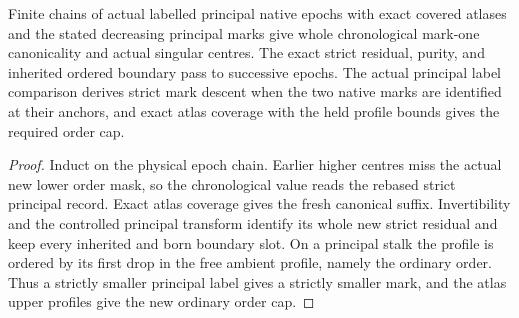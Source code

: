 \begin{theorem}
\label{hir:g8-principal-labelled-epoch-succession}
\leanok
Finite chains of actual labelled principal native epochs with
exact covered atlases and the stated decreasing principal marks
give whole chronological mark-one canonicality and actual
singular centres. The exact strict residual, purity, and inherited
ordered boundary pass to successive epochs. The actual principal
label comparison derives strict mark descent when the two native
marks are identified at their anchors, and exact atlas coverage
with the held profile bounds gives the required order cap.
\end{theorem}
\begin{proof}
Induct on the physical epoch chain. Earlier higher centres
miss the actual new lower order mask, so the chronological
value reads the rebased strict principal record. Exact atlas
coverage gives the fresh canonical suffix. Invertibility and
the controlled principal transform identify its whole new strict
residual and keep every inherited and born boundary slot. On a
principal stalk the profile is ordered by its first drop in
the free ambient profile, namely the ordinary order. Thus a
strictly smaller principal label gives a strictly smaller mark,
and the atlas upper profiles give the new ordinary order cap.
\end{proof}

